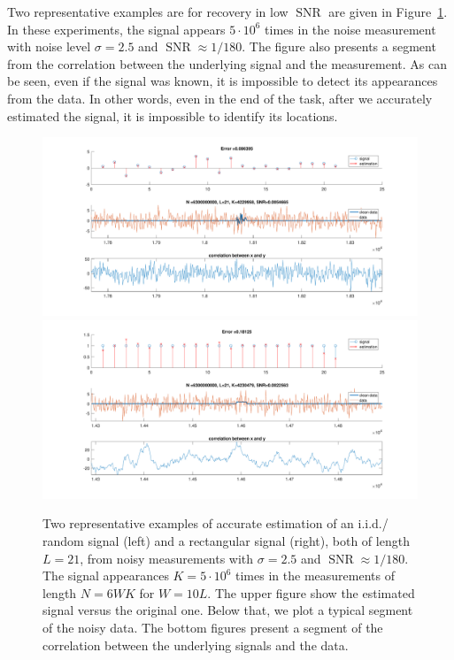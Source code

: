 \documentclass[journal]{IEEEtran}
\numberwithin{equation}{section}
\numberwithin{figure}{section}
\theoremstyle{plain}
\theoremstyle{definition}
\theoremstyle{remark}
\theoremstyle{plain}
\theoremstyle{remark}
\theoremstyle{plain}
\theoremstyle{plain}
\newcommand{\SNR}{\operatorname{SNR}}
\begin{document}
Two representative examples are for recovery in low $\SNR$ are given in Figure~\ref{fig:representative_example}.  In these experiments, the signal appears $5\cdot10^6$ times in the noise measurement with noise level $\sigma=2.5$ and $\SNR\approx 1/180$. The figure also presents a segment from the  correlation between the underlying signal and the measurement. As can be seen, even if the signal was known, it is impossible to detect its appearances from the data. In other words, even in the end of the task, after we accurately estimated the signal, it is impossible to identify its locations. 


\begin{figure}
	\centering
	\includegraphics[scale=0.26]{example_random_signal.pdf}
	\includegraphics[scale=0.26]{example_rect_signal.pdf}	
	\caption{\label{fig:representative_example} Two representative examples of accurate estimation of an i.i.d./ random signal (left) and a rectangular signal (right), both of length $L=21$, from noisy measurements with $\sigma=2.5$ and $\SNR\approx 1/180$. The signal appearances $K=5\cdot 10^6$ times in the measurements of length $N=6WK$ for $W=10L$. The upper figure show the estimated signal versus the original one. Below that, we plot a typical segment of the noisy data. The bottom figures present a segment of the correlation between the underlying signals and the data.}
\end{figure}
\end{document}
